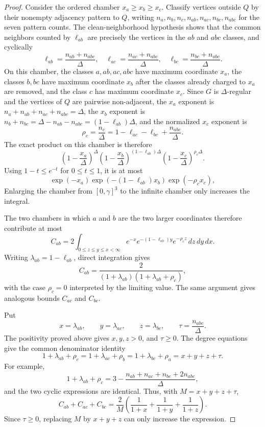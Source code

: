 \begin{proof}
Consider the ordered chamber $x_a\ge x_b\ge x_c$.  Classify vertices outside
$Q$ by their nonempty adjacency pattern to $Q$, writing
$n_a,n_b,n_c,n_{ab},n_{ac},n_{bc},n_{abc}$ for the seven pattern counts.
The clean-neighborhood hypothesis shows that the common neighbors counted by
$\ell_{ab}$ are precisely the vertices in the $ab$ and $abc$ classes, and
cyclically
\[
\ell_{ab}=\frac{n_{ab}+n_{abc}}{\Delta},\quad
\ell_{ac}=\frac{n_{ac}+n_{abc}}{\Delta},\quad
\ell_{bc}=\frac{n_{bc}+n_{abc}}{\Delta}.
\]
On this chamber, the classes $a,ab,ac,abc$ have maximum coordinate $x_a$,
the classes $b,bc$ have maximum coordinate $x_b$ after the classes already
charged to $x_a$ are removed, and the class $c$ has maximum coordinate
$x_c$.  Since $G$ is $\Delta$-regular and the vertices of $Q$ are pairwise
non-adjacent, the $x_a$ exponent is
$n_a+n_{ab}+n_{ac}+n_{abc}=\Delta$, the $x_b$ exponent is
$n_b+n_{bc}=\Delta-n_{ab}-n_{abc}=(1-\ell_{ab})\Delta$, and the normalized
$x_c$ exponent is
\[
\rho_c
=\frac{n_c}{\Delta}
=1-\ell_{ac}-\ell_{bc}+\frac{n_{abc}}{\Delta}.
\]
The exact product on this chamber is therefore
\[
\left(1-\frac{x_a}{\Delta}\right)^\Delta
\left(1-\frac{x_b}{\Delta}\right)^{(1-\ell_{ab})\Delta}
\left(1-\frac{x_c}{\Delta}\right)^{\rho_c\Delta}.
\]
Using $1-t\le e^{-t}$ for $0\le t\le1$, it is at most
\[
\exp(-x_a)\exp(-(1-\ell_{ab})x_b)\exp(-\rho_c x_c),
\]
Enlarging the chamber from
$[0,\gamma]^3$ to the infinite chamber only increases the integral.

The two chambers in which $a$ and $b$ are the two larger coordinates
therefore contribute at most
\[
C_{ab}=2\int_{0\le z\le y\le x<\infty}
e^{-x}e^{-(1-\ell_{ab})y}e^{-\rho_c z}\,dz\,dy\,dx .
\]
Writing $\lambda_{ab}=1-\ell_{ab}$, direct integration gives
\[
C_{ab}=\frac{2}{(1+\lambda_{ab})(1+\lambda_{ab}+\rho_c)},
\]
with the case $\rho_c=0$ interpreted by the limiting value.  The same
argument gives analogous bounds $C_{ac}$ and $C_{bc}$.

Put
\[
x=\lambda_{ab},\qquad y=\lambda_{ac},\qquad z=\lambda_{bc},\qquad
\tau=\frac{n_{abc}}{\Delta}.
\]
The positivity proved above gives $x,y,z>0$, and $\tau\ge0$.  The degree
equations give the common denominator identity
\[
1+\lambda_{ab}+\rho_c
=1+\lambda_{ac}+\rho_b
=1+\lambda_{bc}+\rho_a
=x+y+z+\tau.
\]
For example,
\[
1+\lambda_{ab}+\rho_c
=3-\frac{n_{ab}+n_{ac}+n_{bc}+2n_{abc}}{\Delta},
\]
and the two cyclic expressions are identical.  Thus, with
$M=x+y+z+\tau$,
\[
C_{ab}+C_{ac}+C_{bc}
=\frac2M\left(\frac1{1+x}+\frac1{1+y}+\frac1{1+z}\right).
\]
Since $\tau\ge0$, replacing $M$ by $x+y+z$ can only increase the expression.


\end{proof}
